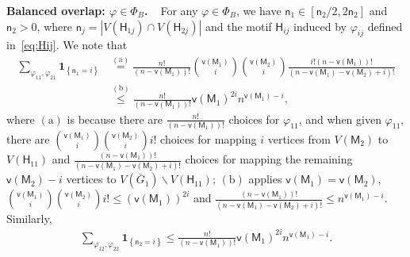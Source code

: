\documentclass[letterpaper,11pt]{article}
\theoremstyle{definition}
\newcommand{\vn}{\mathsf{{v}}}
\newcommand{\sfH}{{\mathsf{H}}}
\newcommand{\sfM}{{\mathsf{M}}}
\newcommand{\sfn}{{\mathsf{n}}}
\newcommand{\indc}[1]{{\mathbf{1}_{\left\{{#1}\right\}}}}
\newcommand{\vp}{\varphi}
\begin{document}
\textbf{Balanced overlap: $\vp\in \Phi_B$.\ \ }For any $\vp\in\Phi_B$, we have $\sfn_1\in [\sfn_2/2,2\sfn_2]$ and $\sfn_2>0$,
where $\sfn_j = |V(\sfH_{1j})\cap V(\sfH_{2j})|$ and the motif $\sfH_{ij}$ induced by $\vp_{ij}$ defined in~\eqref{eq:Hij}.
We note that \begin{align}
    \nonumber \sum_{\vp_{11},\vp_{21}}\indc{\sfn_1=i} &\overset{\mathrm{(a)}}{=} \frac{n!}{(n-\vn(\sfM_1))!}\binom{\vn(\sfM_1)}{i}\binom{\vn(\sfM_2)}{i} \frac{i!(n-\vn(\sfM_1))!}{(n-\vn(\sfM_1)-\vn(\sfM_2)+i)!}\\\label{eq:sum-indc-V1V2}&\overset{\mathrm{(b)}}{\le} \frac{n!}{(n-\vn(\sfM_1))!} \vn(\sfM_1)^{2i} n^{\vn(\sfM_1)-i},
\end{align}
where $\mathrm{(a)}$ is because there are $\frac{n!}{(n-\vn(\sfM_1))!}$ choices for $\vp_{11}$, and when given $\vp_{11}$, there are $\binom{\vn(\sfM_1)}{i}\binom{\vn(\sfM_2)}{i}i!$ choices for mapping $i$ vertices from $V(\sfM_2)$ to $V(\sfH_{11})$ and $\frac{(n-\vn(\sfM_1))!}{(n-\vn(\sfM_1)-\vn(\sfM_2)+i)!}$ choices for mapping the remaining $\vn(\sfM_2)-i$ vertices to $V(\bar{G}_1)\backslash V(\sfH_{11})$; $\mathrm{(b)}$ applies $\vn(\sfM_1) = \vn(\sfM_2)$, $\binom{\vn(\sfM_1)}{i}\binom{\vn(\sfM_2)}{i}i!\le (\vn(\sfM_1))^{2i}$ and $\frac{(n-\vn(\sfM_1))!}{(n-\vn(\sfM_1)-\vn(\sfM_2)+i)!}\le n^{\vn(\sfM_1)-i}$.
Similarly, \begin{align}\label{eq:sum-indc-V3V4}
    \sum_{\vp_{12},\vp_{22}}\indc{\sfn_2=i}\le \frac{n!}{(n-\vn(\sfM_1))!} \vn(\sfM_1)^{2i} n^{\vn(\sfM_1)-i}.
\end{align}
\end{document}
